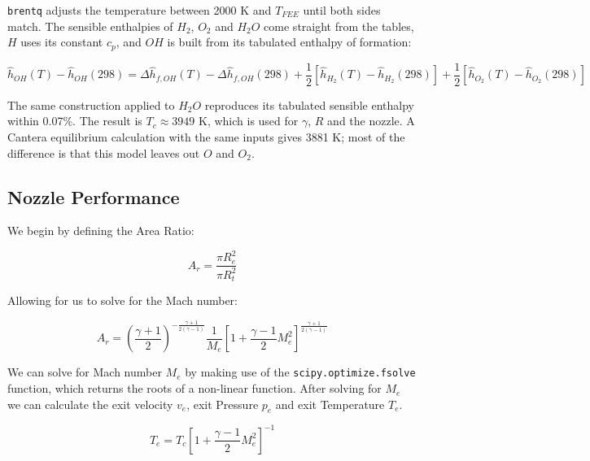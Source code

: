 \documentclass[12pt, Times New Roman]{article}
\begin{document}
    \verb|brentq| adjusts the temperature between 2000 K and $T_{FEE}$ until both sides match. The sensible enthalpies of
    $H_{2}$, $O_{2}$ and $H_{2}O$ come straight from the tables, $H$ uses its constant $c_{p}$, and $OH$ is built from its
    tabulated enthalpy of formation:

    \begin{equation}
        \hat{h}_{OH}(T) - \hat{h}_{OH}(298) = \Delta \hat{h}_{f,OH}(T) - \Delta \hat{h}_{f,OH}(298) + \frac{1}{2}\left[\hat{h}_{H_{2}}(T) - \hat{h}_{H_{2}}(298)\right] + \frac{1}{2}\left[\hat{h}_{O_{2}}(T) - \hat{h}_{O_{2}}(298)\right]
    \end{equation}

    The same construction applied to $H_{2}O$ reproduces its tabulated sensible enthalpy within 0.07\%. The result is
    $T_{c} \approx 3949$ K, which is used for $\gamma$, $R$ and the nozzle. A Cantera equilibrium calculation with the same
    inputs gives 3881 K; most of the difference is that this model leaves out $O$ and $O_{2}$.

    \subsection{Nozzle Performance}
    We begin by defining the Area Ratio:

    \begin{equation}
        A_{r} = \frac{\pi R_{e}^{2}}{\pi R_{t}^{2}}
    \end{equation}

    Allowing for us to solve for the Mach number:

    \begin{equation}
        A_{r} = \left(\frac{\gamma + 1}{2}\right)^{-\frac{\gamma + 1}{2(\gamma - 1)}} \frac{1}{M_{e}} \left[1 + \frac{\gamma - 1}{2} M_{e}^{2}\right]^{\frac{\gamma + 1}{2(\gamma - 1)}}
    \end{equation}

    We can solve for Mach number $M_{e}$ by making use of the \verb|scipy.optimize.fsolve| function, which returns the roots 
    of a non-linear function. After solving for $M_{e}$ we can calculate the exit velocity $v_{e}$, exit Pressure $p_{e}$ and exit Temperature $T_{e}$.

    \begin{equation}
        \label{eq:exit-temperature}
        T_{e} = T_{c} \left[1 + \frac{\gamma - 1}{2} M_{e}^{2}\right]^{-1} 
    \end{equation}
\end{document}
